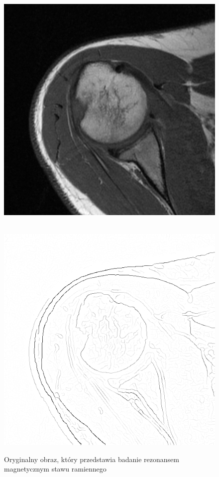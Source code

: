 \documentclass[a4paper,11pt,twoside,openright]{report}
\theoremstyle{definition}
\begin{document}
\begin{figure}[p!]
	\center
		\includegraphics[width=\linewidth]{123}
		\caption{Oryginalny obraz, który przedstawia badanie rezonansem magnetycznym
		stawu ramiennego}
		\label{fig:123}
	\endminipage
	\\
		\includegraphics[width=\linewidth]{126}

\end{figure}
\end{document}
